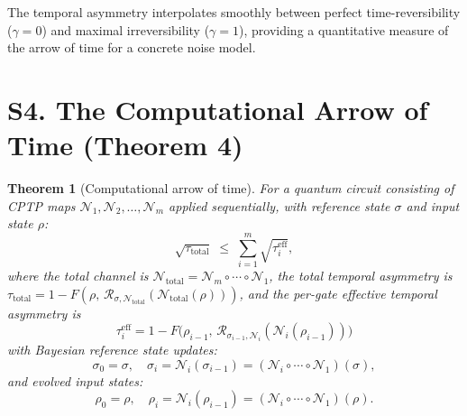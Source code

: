 \documentclass[prl,twocolumn,superscriptaddress,longbibliography]{revtex4-2}
\newtheorem{theorem}{Theorem}
\newcommand{\Petz}{\mathcal{R}}
\newcommand{\chan}{\mathcal{N}}
\newcommand{\tauasym}{\tau}
\begin{document}
The temporal asymmetry interpolates smoothly between perfect
time-reversibility ($\gamma = 0$) and maximal irreversibility
($\gamma = 1$), providing a quantitative measure of the arrow
of time for a concrete noise model.

\section{S4. The Computational Arrow of Time (Theorem 4)}
\label{sec:thm4}

\begin{theorem}[Computational arrow of time]
\label{thm:comp_arrow}
For a quantum circuit consisting of CPTP maps
$\chan_1, \chan_2, \ldots, \chan_m$ applied sequentially,
with reference state $\sigma$ and input state $\rho$:
\begin{equation}
\sqrt{\tauasym_{\mathrm{total}}} \;\leq\;
\sum_{i=1}^{m} \sqrt{\tauasym_i^{\mathrm{eff}}},
\label{eq:comp_arrow}
\end{equation}
where the total channel is
$\chan_{\mathrm{total}} = \chan_m \circ \cdots \circ \chan_1$, the
total temporal asymmetry is
$\tauasym_{\mathrm{total}} = 1 - F(\rho,\,
\Petz_{\sigma, \chan_{\mathrm{total}}}(\chan_{\mathrm{total}}(\rho)))$,
and the per-gate effective temporal asymmetry is
\begin{equation}
\tauasym_i^{\mathrm{eff}} = 1 - F\!\big(\rho_{i-1},\,
\Petz_{\sigma_{i-1},\chan_i}(\chan_i(\rho_{i-1}))\big)
\label{eq:tau_eff}
\end{equation}
with Bayesian reference state updates:
\begin{equation}
\sigma_0 = \sigma, \quad
\sigma_i = \chan_i(\sigma_{i-1}) = (\chan_i \circ \cdots \circ \chan_1)(\sigma),
\end{equation}
and evolved input states:
\begin{equation}
\rho_0 = \rho, \quad
\rho_i = \chan_i(\rho_{i-1}) = (\chan_i \circ \cdots \circ \chan_1)(\rho).
\end{equation}
\end{theorem}
\end{document}

